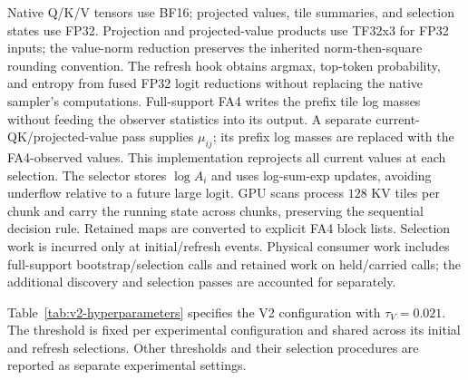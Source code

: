 \documentclass[10pt]{article}
\begin{document}
Native Q/K/V tensors use BF16; projected values, tile summaries, and
selection states use FP32. Projection and projected-value products use
TF32x3 for FP32 inputs; the value-norm reduction preserves the inherited
norm-then-square rounding convention. The refresh hook obtains argmax,
top-token probability, and entropy from fused FP32 logit reductions without
replacing the native sampler's computations. Full-support FA4 writes the prefix tile log
masses without feeding the observer statistics into its output. A separate
current-QK/projected-value pass supplies $\mu_{ij}$; its prefix log masses
are replaced with the FA4-observed values. This implementation reprojects
all current values at each selection. The selector stores $\log A_i$ and
uses log-sum-exp updates, avoiding underflow relative to a future large
logit. GPU scans process $128$ KV tiles per chunk and carry the running
state across chunks, preserving the sequential decision rule. Retained maps
are converted to explicit FA4 block lists. Selection work is incurred only
at initial/refresh events. Physical consumer work includes full-support
bootstrap/selection calls and retained work on held/carried calls; the
additional discovery and selection passes are accounted for separately.

Table~\ref{tab:v2-hyperparameters} specifies the V2 configuration with
$\tau_V=0.021$. The threshold is fixed per experimental configuration and
shared across its initial and refresh selections. Other thresholds and
their selection procedures are reported as separate experimental settings.
\end{document}
